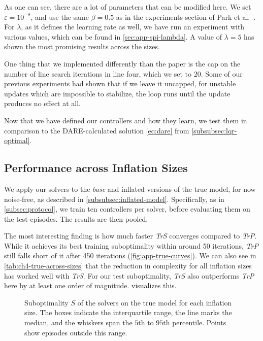 As one can see, there are a lot of parameters that can be modified here. We set $\varepsilon = 10^{-8}$,
and use the same $\beta = 0.5$ as in the experiments section of Park et al.~\cite[Sec.~4.2]{Park2020Structured}.
For $\lambda$, as it defines the learning rate as well, we have run an experiment with various values,
which can be found in \cref{sec:app-spi-lambda}. A value of $\lambda = 5$ has shown the most promising results across the sizes.

One thing that we implemented differently than the paper is the cap on the number of line search iterations in line four, which we set to 20.
Some of our previous experiments had shown that if we leave it uncapped, for unstable updates which are impossible
to stabilize, the loop runs until the update produces no effect at all.

Now that we have defined our controllers and how they learn, we test them in comparison to the DARE-calculated
solution \eqref{eq:dare} from \cref{subsubsec:lqr-optimal}.

\subsection{Performance across Inflation Sizes}
\label{subsec:known-model-results}

We apply our solvers to the \emph{base} and inflated versions of the true model, for now noise-free, as described in
\cref{subsubsec:inflated-model}.
Specifically, as in \cref{subsec:protocol}, we train ten controllers per solver, before evaluating them on the test episodes.
The results are then pooled.

The most interesting finding is how much faster \emph{TrS} converges compared to \emph{TrP}. While it achieves its best training
suboptimality within around 50 iterations, \emph{TrP} still falls short of it after 450 iterations (\cref{fig:app-true-curves}). We can also see in
\cref{tab:ch4-true-across-sizes} that the reduction in complexity for all inflation sizes has worked well with \emph{TrS}.
For our test suboptimality, \emph{TrS} also outperforms \emph{TrP} here by at least one order of magnitude. 
visualizes this.



\begin{figure}[htbp]
  \centering
  \caption{Suboptimality $S$ of the solvers on the true model for each inflation size. The boxes indicate the interquartile
  range, the line marks the median, and the whiskers span the $5$th to $95$th percentile. Points show episodes outside this range.}
  \label{fig:true-across-sizes-subopt}
\end{figure}

